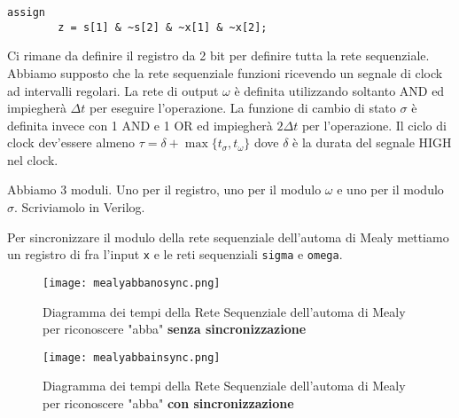 \begin{exrc}
	\begin{lstlisting}[style={verilog}]
	assign
		z = s[1] & ~s[2] & ~x[1] & ~x[2];
	\end{lstlisting}



	 Ci rimane da definire il registro da 2 bit per definire tutta la rete
	sequenziale. Abbiamo supposto che la rete sequenziale funzioni ricevendo un
	segnale di clock ad intervalli regolari. La rete di output $ \omega $ è
	definita utilizzando soltanto AND ed impiegherà $ \Delta t $ per eseguire
	l'operazione. La funzione di cambio di stato $ \sigma $ è definita invece
	con 1 AND e 1 OR ed impiegherà $ 2\Delta t $ per l'operazione. Il ciclo di
	clock dev'essere almeno $ \tau = \delta + \max\{t_{\sigma}, t_{\omega}\} $
	dove $ \delta $ è la durata del segnale HIGH nel clock.

	Abbiamo 3 moduli. Uno per il registro, uno per il modulo $ \omega $ e uno
	per il modulo $ \sigma $. Scriviamolo in Verilog.


	
	Per sincronizzare il modulo della rete sequenziale dell'automa di Mealy
	mettiamo un registro di fra l'input \texttt{x} e le reti sequenziali
	\texttt{sigma} e \texttt{omega}.

	\begin{figure}[!htb]
		\centering
		\caption{Diagramma dei tempi della Rete Sequenziale dell'automa di Mealy per riconoscere "abba" \textbf{senza sincronizzazione}}
		\texttt{[image: mealyabbanosync.png]}
	\end{figure}
	
	\begin{figure}[!htb]
		\centering
		\caption{Diagramma dei tempi della Rete Sequenziale dell'automa di Mealy per riconoscere "abba" \textbf{con sincronizzazione}}
		\texttt{[image: mealyabbainsync.png]}
	\end{figure}
\end{exrc}



